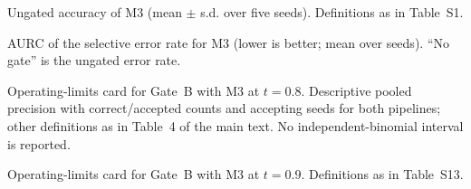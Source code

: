 \documentclass[11pt,letterpaper]{article}
\begin{document}
\begin{table}[htbp]
\centering
\caption{Ungated accuracy of M3 (mean $\pm$ s.d. over five seeds). Definitions as in Table~S1.}
\small

\end{table}

\begin{table}[htbp]
\centering
\caption{AURC of the selective error rate for M3 (lower is better; mean over seeds). ``No gate'' is the ungated error rate.}
\small

\end{table}

\begin{table}[htbp]
\centering
\caption{Operating-limits card for Gate~B with M3 at $t = 0.8$. Descriptive pooled precision with correct/accepted counts and accepting seeds for both pipelines; other definitions as in Table~4 of the main text. No independent-binomial interval is reported.}
\small
\resizebox{\linewidth}{!}{}
\end{table}

\begin{table}[htbp]
\centering
\caption{Operating-limits card for Gate~B with M3 at $t = 0.9$. Definitions as in Table~S13.}
\small
\resizebox{\linewidth}{!}{}
\end{table}
\end{document}
